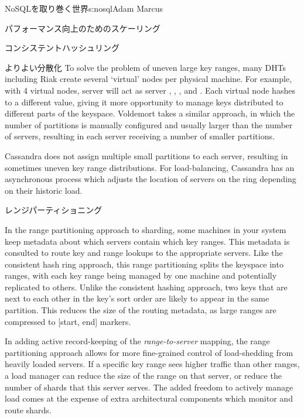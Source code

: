 \begin{aosachapter}{NoSQLを取り巻く世界}{s:nosql}{Adam Marcus}
\begin{aosasect1}{パフォーマンス向上のためのスケーリング}
\begin{aosasect2}{コンシステントハッシュリング}
\begin{aosasect3}{よりよい分散化}
To solve the problem of uneven large key ranges, many DHTs including
Riak create several `virtual' nodes per physical machine.  For
example, with 4 virtual nodes, server  will act as server
, , , and .  Each virtual
node hashes to a different value, giving it more opportunity to manage
keys distributed to different parts of the keyspace.  Voldemort takes
a similar approach, in which the number of partitions is manually
configured and usually larger than the number of servers, resulting in
each server receiving a number of smaller partitions.

Cassandra does not assign multiple small partitions to each server,
resulting in sometimes uneven key range distributions.  For
load-balancing, Cassandra has an asynchronous process which adjusts
the location of servers on the ring depending on their historic load.

\end{aosasect3}

\end{aosasect2}

\vspace{-0.2cm} %
\begin{aosasect2}{レンジパーティショニング}
\vspace{-0.1cm} %

In the range partitioning approach to sharding, some machines in your
system keep metadata about which servers contain which key ranges.
This metadata is consulted to route key and range lookups to the
appropriate servers.  Like the consistent hash ring approach, this
range partitioning splits the keyspace into ranges, with each key
range being managed by one machine and potentially replicated to
others.  Unlike the consistent hashing approach, two keys that are
next to each other in the key's sort order are likely to appear in the
same partition.  This reduces the size of the routing metadata, as
large ranges are compressed to [start, end] markers.

In adding active record-keeping of the \emph{range-to-server} mapping,
the range partitioning approach allows for more fine-grained control
of load-shedding from heavily loaded servers.  If a specific key range
sees higher traffic than other ranges, a load manager can reduce the
size of the range on that server, or reduce the number of shards that
this server serves.  The added freedom to actively manage load comes
at the expense of extra architectural components which monitor and
route shards.


\end{aosasect2}
\end{aosasect1}
\end{aosachapter}
